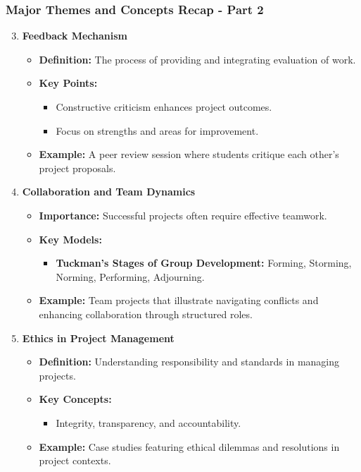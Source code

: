 \documentclass[aspectratio=169]{beamer}
\begin{document}
\begin{frame}[fragile]
    \frametitle{Major Themes and Concepts Recap - Part 2}
    \begin{enumerate}
        \setcounter{enumi}{2} %
        \item \textbf{Feedback Mechanism}
            \begin{itemize}
                \item \textbf{Definition:} The process of providing and integrating evaluation of work.
                \item \textbf{Key Points:} 
                    \begin{itemize}
                        \item Constructive criticism enhances project outcomes.
                        \item Focus on strengths and areas for improvement.
                    \end{itemize}
                \item \textbf{Example:} A peer review session where students critique each other's project proposals.
            \end{itemize}

        \item \textbf{Collaboration and Team Dynamics}
            \begin{itemize}
                \item \textbf{Importance:} Successful projects often require effective teamwork.
                \item \textbf{Key Models:}
                    \begin{itemize}
                        \item \textbf{Tuckman's Stages of Group Development:} Forming, Storming, Norming, Performing, Adjourning.
                    \end{itemize}
                \item \textbf{Example:} Team projects that illustrate navigating conflicts and enhancing collaboration through structured roles.
            \end{itemize}

        \item \textbf{Ethics in Project Management}
            \begin{itemize}
                \item \textbf{Definition:} Understanding responsibility and standards in managing projects.
                \item \textbf{Key Concepts:}
                    \begin{itemize}
                        \item Integrity, transparency, and accountability.
                    \end{itemize}
                \item \textbf{Example:} Case studies featuring ethical dilemmas and resolutions in project contexts.
            \end{itemize}
    \end{enumerate}
\end{frame}
\end{document}
